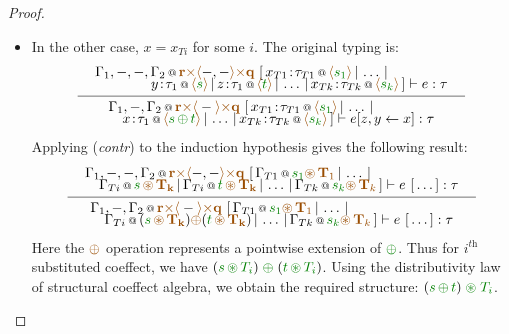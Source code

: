 \begin{proof}
\begin{itemize}
\item In the other case, $x=x_{Ti}$ for some $i$. The original typing is:
\[
\inference
  {{ \begin{array}{l}
     \coctx{\Gamma_1,-,-,\Gamma_2}{\aclrd{\textbf{r}} \atimes \alift{-,-} \atimes \aclrd{\textbf{q}}}~
         [\,\coctx{x_{T1}\!:\!\tau_{T1}}{\alift{\cclrd{s_1}}} \,|\, \ldots \,|\,
     \\[-0.35em] \hspace{4em}
     \coctx{y\!:\!\tau_1}{\alift{\cclrd{s}}} \,|\,
     \coctx{z\!:\!\tau_1}{\alift{\cclrd{t}}}
     \,|\, \ldots \,|\, \coctx{x_{Tk}\!:\!\tau_{Tk}}{\alift{\cclrd{s_k}}}\,]
    \vdash e : \tau
    \end{array} }}
  { \begin{array}{l}
    \coctx{\Gamma_1,-,\Gamma_2}{\aclrd{\textbf{r}} \atimes \alift{-} \atimes \aclrd{\textbf{q}}}~
        [\,\coctx{x_{T1}\!:\!\tau_{T1}}{\alift{\cclrd{s_1}}} \,|\, \ldots \,|\,
     \\[-0.35em] \quad
     \coctx{x\!:\!\tau_1}{ \alift{\cclrd{s} \,\cpar\, \cclrd{t}} }
     \,|\, \ldots \,|\, \coctx{x_{Tk}\!:\!\tau_{Tk}}{\alift{\cclrd{s_k}}}\,]
    \vdash \subst{e}{z,y}{x} : \tau
    \end{array} }
\]
Applying (\emph{contr}) to the induction hypothesis gives the following result:
\[
\inference
  {{ \begin{array}{l}
     \coctx{\Gamma_1,-,-,\Gamma_2}{\aclrd{\textbf{r}} \atimes \alift{-,-} \atimes \aclrd{\textbf{q}}}~
         [\,\coctx{\Gamma_{T1}}{\cclrd{s_1}\aseq\,\aclrd{\textbf{T}_1}} \,|\, \ldots \,|\,
     \\[-0.35em] \quad
     \coctx{\Gamma_{Ti}}{\cclrd{s}\,\aseq\,\aclrd{\mathbf{T_k}} } \,|\,
     \coctx{\Gamma_{Ti}}{\cclrd{t}\,\aseq\,\aclrd{\mathbf{T_k}} }
     \,|\, \ldots \,|\, \coctx{\Gamma_{Tk}}{\cclrd{s_k}\aseq\,\aclrd{\textbf{T}_k}}\,]
    \vdash e~[\,\ldots\,] : \tau
    \end{array} }}
  {{ \begin{array}{l}
     \coctx{\Gamma_1,-,\Gamma_2}{\aclrd{\textbf{r}} \atimes \alift{-} \atimes \aclrd{\textbf{q}}}~
         [\,\coctx{\Gamma_{T1}}{\cclrd{s_1}\aseq\,\aclrd{\textbf{T}_1}} \,|\, \ldots \,|\,
     \\[-0.35em] \quad
     \coctx{\Gamma_{Ti}}{ (\cclrd{s}\,\aseq\,\aclrd{\mathbf{T_k}}) \aparstr (\cclrd{t}\,\aseq\,\aclrd{\mathbf{T_k}})}
     \,|\, \ldots \,|\, \coctx{\Gamma_{Tk}}{\cclrd{s_k}\aseq\,\aclrd{\textbf{T}_k}}\,]
    \vdash e~[\,\ldots\,] : \tau
    \end{array} }}
\]
Here the $\aparstr$ operation represents a pointwise extension of $\cpar$. Thus for $i^{\textit{th}}$ 
substituted coeffect, we have $(\cclrd{s}\,\cseq\,\cclrd{T_i})\;\cpar\;(\cclrd{t}\,\cseq\,\cclrd{T_i})$.
Using the distributivity law of structural coeffect algebra, we obtain the required structure:
$(\cclrd{s}\,\cpar\,\cclrd{t})\;\cseq\;\cclrd{T_i}$.


\end{itemize}
\end{proof}

